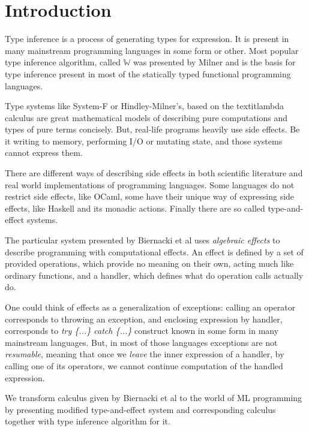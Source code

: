 \documentclass[declaration,shortabstract]{iithesis}
\author         {Dominik Gulczyński}
\begin{document}
\chapter{Introduction}

Type inference is a process of generating types for expression. 
It is present in many mainstream programming languages in some form or other.
Most popular type inference algorithm, called $\mathbb{W}$ was presented by Milner\cite{milner}
and is the basis for type inference present in most of the statically typed
functional programming languages.

Type systems like System-F or Hindley-Milner's, based on the textit{lambda calculus}
are great mathematical models of describing pure computations and types of pure terms concisely.
But, real-life programs heavily use side effects.
Be it writing to memory, performing I/O or mutating state, and those systems cannot express them.

There are different ways of describing side effects in both scientific literature
and real world implementations of programming languages.
Some languages do not restrict side effects, like OCaml,
some have their unique way of expressing side effects, like Haskell and its monadic actions.
Finally there are so called type-and-effect systems.

The particular system presented by Biernacki et al\cite{binders-labels} uses \textit{algebraic effects} to describe
programming with computational effects.
An effect is defined by a set of provided operations, which provide no meaning
on their own, acting much like ordinary functions, and a handler, which
defines what do operation calls actually do.

One could think of effects as a generalization of exceptions:
calling an operator corresponds to throwing an exception,
and enclosing expression by handler, corresponds to \textit{try \{...\} catch \{...\}}
construct known in some form in many mainstream languages.
But, in most of those languages exceptions are not \textit{resumable},
meaning that once we \textit{leave} the inner expression of a handler,
by calling one of its operators, we cannot continue computation of
the handled expression. 

We transform calculus given by Biernacki et al to the world of ML programming
by presenting modified type-and-effect system and corresponding calculus
together with type inference algorithm for it.
\end{document}
